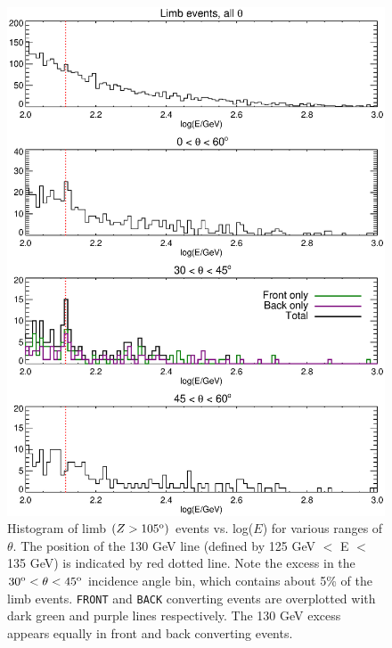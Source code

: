 \documentclass[aps,twocolumn,prd,superscriptaddress,showpacs,nofootinbib,fixfloat]{revtex4}
\newcommand{\degree}{^{\rm o}}
\begin{document}
\begin{figure}
  \centering
  \includegraphics[width=1.0\linewidth]{plots/Ehist-all.ps}
  \caption{Histogram of limb $(Z>105\degree)$ events vs.
    log($E$) for various ranges of $\theta$. The position of
    the 130 GeV line (defined by 125 GeV $<$ E $<$ 135 GeV) is
    indicated by red dotted line.  Note the excess in the
    $30\degree < \theta < 45\degree$ incidence angle bin,
    which contains about 5\% of the limb
    events. \texttt{FRONT} and \texttt{BACK} converting
    events are overplotted with dark green and purple lines
    respectively. The 130 GeV excess appears equally in
    front and back converting events.}
  \label{fig:Ehist-all}
\end{figure}
\end{document}
